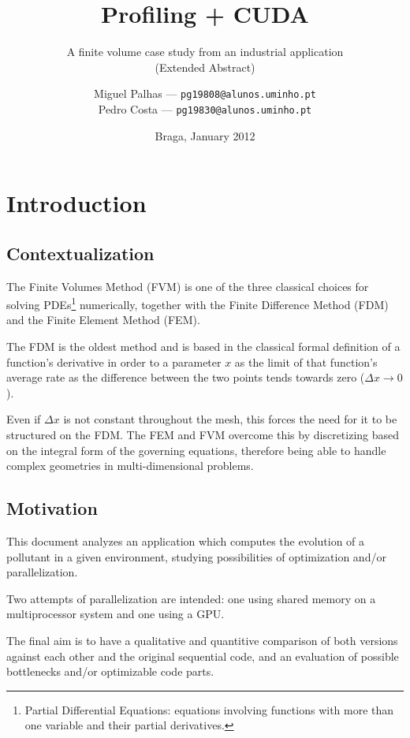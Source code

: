 \documentclass[9pt,twocolumn]{scrartcl}
\title{Profiling + CUDA}
\subtitle{A finite volume case study from an industrial application\\(Extended Abstract)}%
\author{Miguel Palhas \hfill--- \texttt{\smaller pg19808@alunos.uminho.pt}\\Pedro Costa \hfill--- \texttt{\smaller pg19830@alunos.uminho.pt}}
\date{Braga, January 2012}
\begin{document}
\maketitle

\section{Introduction}
\subsection{Contextualization}
The Finite Volumes Method (FVM) is one of the three classical choices for solving PDEs\footnote{Partial Differential Equations: equations involving functions with more than one variable and their partial derivatives.} numerically, together with the Finite Difference Method (FDM) and the Finite Element Method (FEM).

The FDM is the oldest method and is based in the classical formal definition of a function's derivative in order to a parameter $x$ as the limit of that function's average rate as the difference between the two points tends towards zero ($\Delta x \rightarrow 0$).


Even if $\Delta x$ is not constant throughout the mesh, this forces the need for it to be structured on the FDM. The FEM and FVM overcome this by discretizing based on the integral form of the governing equations, therefore being able to handle complex geometries in multi-dimensional problems.




\subsection{Motivation}%
This document analyzes an application which computes the evolution of a pollutant in a given environment, studying possibilities of optimization and/or parallelization.

Two attempts of parallelization are intended: one using shared memory on a multiprocessor system and one using a GPU.

The final aim is to have a qualitative and quantitive comparison of both versions against each other and the original sequential code, and an evaluation of possible bottlenecks and/or optimizable code parts.
\end{document}
